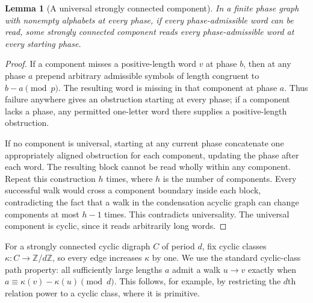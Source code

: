 \documentclass[11pt,letterpaper]{article}
\newtheorem{lemma}[theorem]{Lemma}
\theoremstyle{definition}
\theoremstyle{remark}
\begin{document}
\begin{lemma}[A universal strongly connected component]\label{ccc:sc:lem:universal-scc}
In a finite phase graph with nonempty alphabets at every phase, if every phase-admissible word can be read, some strongly connected component reads every phase-admissible word at every starting phase.
\end{lemma}
\begin{proof}
If a component misses a positive-length word $v$ at phase $b$, then at any phase $a$ prepend arbitrary admissible symbols of length congruent to $b-a\pmod p$. The resulting word is missing in that component at phase $a$. Thus failure anywhere gives an obstruction starting at every phase; if a component lacks a phase, any permitted one-letter word there supplies a positive-length obstruction.

If no component is universal, starting at any current phase concatenate one appropriately aligned obstruction for each component, updating the phase after each word. The resulting block cannot be read wholly within any component. Repeat this construction $h$ times, where $h$ is the number of components. Every successful walk would cross a component boundary inside each block, contradicting the fact that a walk in the condensation acyclic graph can change components at most $h-1$ times. This contradicts universality. The universal component is cyclic, since it reads arbitrarily long words.
\end{proof}

For a strongly connected cyclic digraph $C$ of period $d$, fix cyclic classes $\kappa:C\to\mathbb Z/d\mathbb Z$, so every edge increases $\kappa$ by one. We use the standard cyclic-class path property: all sufficiently large lengths $a$ admit a walk $u\to v$ exactly when $a\equiv\kappa(v)-\kappa(u)\pmod d$. This follows, for example, by restricting the $d$th relation power to a cyclic class, where it is primitive.
\end{document}
